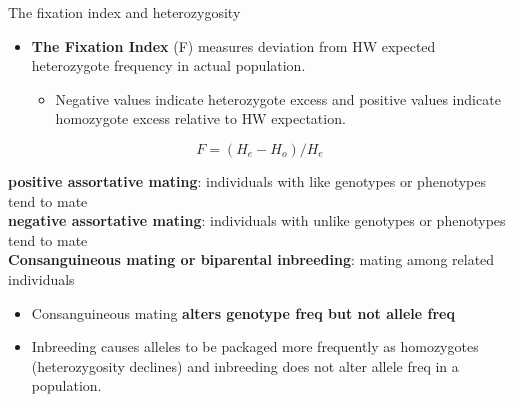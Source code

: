 \documentclass[11pt,dvipsnames,ignorenonframetext,aspectratio=169]{beamer}
\providecommand{\tightlist}{%
  \setlength{\itemsep}{0pt}\setlength{\parskip}{0pt}}
\begin{document}
\begin{frame}{The fixation index and heterozygosity}
\protect\hypertarget{the-fixation-index-and-heterozygosity}{}
\footnotesize

\begin{itemize}
\tightlist
\item
  \textbf{The Fixation Index} (F) measures deviation from HW expected
  heterozygote frequency in actual population.

  \begin{itemize}
  \tightlist
  \item
    Negative values indicate heterozygote excess and positive values
    indicate homozygote excess relative to HW expectation.
  \end{itemize}
\end{itemize}

\[
F = (H_e - H_o) / H_e
\]

\textbf{positive assortative mating}: individuals with like genotypes or
phenotypes tend to mate\\
\textbf{negative assortative mating}: individuals with unlike genotypes
or phenotypes tend to mate\\
\textbf{Consanguineous mating or biparental inbreeding}: mating among
related individuals

\begin{itemize}
\tightlist
\item
  Consanguineous mating \textbf{alters genotype freq but not allele
  freq}
\item
  Inbreeding causes alleles to be packaged more frequently as
  homozygotes (heterozygosity declines) and inbreeding does not alter
  allele freq in a population.
\end{itemize}
\end{frame}
\end{document}
